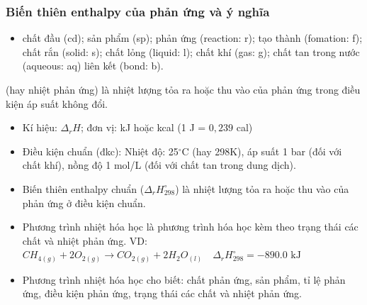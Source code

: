 \documentclass[Main.tex]{subfiles}
\begin{document}
	\subsubsection{Biến thiên enthalpy của phản ứng và ý nghĩa}
		\begin{ghinho}
			\begin{itemize}
				\item chất đầu (cd); sản phẩm (sp); phản ứng (reaction: r); tạo thành (fomation: f); chất rắn (solid: s); chất lỏng (liquid: l); chất khí (gas: g); chất tan trong nước (aqueous: aq) liên kết (bond: b).
			\end{itemize}
		 (hay nhiệt phản ứng) là nhiệt lượng tỏa ra hoặc thu vào của phản ứng trong điều kiện áp suất không đổi.
			\begin{itemize}
				\item Kí hiệu: $\Delta_rH$; đơn vị: kJ hoặc kcal (1 J = $0{,}239$ cal)
			\end{itemize}
		\begin{itemize}
			\item Điều kiện chuẩn (đkc): Nhiệt độ: 25$^\circ$C (hay 298K), áp suất 1 bar (đối với chất khí), nồng độ 1 mol/L (đối với chất tan trong dung dịch).
			\item Biến thiên enthalpy chuẩn ($\Delta_r H^\circ_{298}$) là nhiệt lượng tỏa ra hoặc thu vào của phản ứng ở điều kiện chuẩn.
			\item Phương trình nhiệt hóa học là phương trình hóa học kèm theo trạng thái các chất và nhiệt phản ứng. VD: $CH_{4(g)} + 2O_{2(g)} \rightarrow CO_{2(g)} + 2H_2O_{(l)} \quad \Delta_r H^\circ_{298} = -890.0 \text{ kJ}$
			\item Phương trình nhiệt hóa học cho biết: chất phản ứng, sản phẩm, tỉ lệ phản ứng, điều kiện phản ứng, trạng thái các chất và nhiệt phản ứng.
		\end{itemize}
		\end{ghinho}
\end{document}
